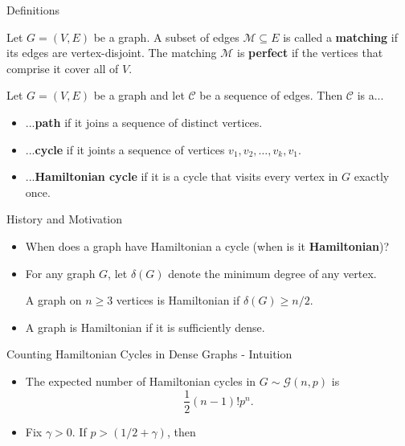 \documentclass{beamer}
\theoremstyle{plain}
\begin{document}
	\begin{frame}{Definitions}
		\begin{definition}
			Let $G = (V, E)$ be a graph.
			A subset of edges $\mathcal{M}\subseteq E$ is called a \textbf{matching} if its edges are vertex-disjoint.
			The matching $\mathcal{M}$ is \textbf{perfect} if the vertices that comprise it cover all of $V$.
		\end{definition}

		\pause

		\begin{definition}
			Let $G = (V, E)$ be a graph and let $\mathcal{C}$ be a sequence of edges.
			Then $\mathcal{C}$ is a...
			\begin{itemize}
				\item ...\textbf{path} if it joins a sequence of distinct vertices.
				\pause
				\item ...\textbf{cycle} if it joints a sequence of vertices $v_1, v_2, \ldots, v_k, v_1$.
				\pause
				\item ...\textbf{Hamiltonian cycle} if it is a cycle that visits every vertex in $G$ exactly once.
			\end{itemize}
		\end{definition}
	\end{frame}


	\begin{frame}{History and Motivation}
		\begin{itemize}
			\item When does a graph have Hamiltonian a cycle (when is it \textbf{Hamiltonian})?

			\pause

			\item For any graph $G$, let $\delta(G)$ denote the minimum degree of any vertex.

			\pause

			\begin{theorem}[G. Dirac - 1952]
				A graph on $n\geq 3$ vertices is Hamiltonian if $\delta(G)\geq n/2$.
			\end{theorem}

			\pause

			\item A graph is Hamiltonian if it is sufficiently dense.
		\end{itemize}
	\end{frame}


	\begin{frame}{Counting Hamiltonian Cycles in Dense Graphs - Intuition}
		\begin{itemize}
			\item The expected number of Hamiltonian cycles in $G\sim \mathcal{G}(n, p)$ is
			\[
			\frac{1}{2}(n-1)!p^n.
			\]

			\pause

			\item Fix $\gamma>0$.
			If $p>(1/2+\gamma)$, then 
		\end{itemize}
	\end{frame}
\end{document}
